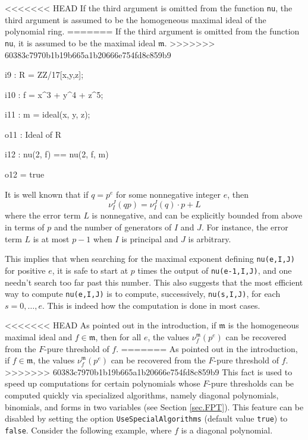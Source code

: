 \documentclass{amsart}
\newcommand{\idealm}{\mathfrak{m}}
\begin{document}

<<<<<<< HEAD
If the third argument is omitted from the function {\tt nu}, the third argument is assumed to be the homogeneous maximal ideal of the polynomial ring.
=======
If the third argument is omitted from the function {\tt nu}, it is assumed to be the maximal ideal $\idealm$. 
>>>>>>> 60383c7970b1b19b665a1b20666e754fd8c859b9

{\small
{}
\begin{MyVerbatim}

i9 : R = ZZ/17[x,y,z];

i10 : f = x^3 + y^4 + z^5;

i11 : m = ideal(x, y, z);

o11 : Ideal of R

i12 : nu(2, f) == nu(2, f, m)

o12 = true
\end{MyVerbatim}
}
\medspace


It is well known that if $q=p^e$ for some nonnegative integer $e$, then \[ \nu_I^J(qp) = \nu_I^J(q)\cdot p + L\]  where the error term $L$ is nonnegative, and can be explicitly bounded from above in terms of $p$ and the number of generators of $I$ and $J$.  For instance, the error term $L$ is at most $p-1$ when $I$ is principal and $J$ is arbitrary.

This implies that when searching for the maximal exponent defining {\tt nu(e,I,J)} for positive $e$, it is safe to start at $p$ times the output of {\tt nu(e-1,I,J)}, and one needn't search too far past this number.  This also suggests that the most efficient way to compute {\tt nu(e,I,J)} is to compute, successively, {\tt nu(s,I,J)}, for each $s = 0,\ldots,e$.  This is indeed how the computation is done in most cases.

<<<<<<< HEAD
As pointed out in the introduction, if $\mathfrak{m}$ is the homogeneous maximal ideal and $f \in \mathfrak{m}$, then for all $e$, the values $\nu^{\mathfrak{m}}_f(p^e)$ can be recovered from the $F$-pure threshold of $f$.
=======
As pointed out in the introduction, if $f \in \mathfrak{m}$, the values $\nu^{\mathfrak{m}}_f(p^e)$ can be recovered from the $F$-pure threshold of $f$.  
>>>>>>> 60383c7970b1b19b665a1b20666e754fd8c859b9
This fact is used to speed up computations for certain polynomials whose $F$-pure thresholds can be computed quickly via specialized algorithms, namely diagonal polynomials, binomials, and forms in two variables (see Section \ref{sec.FPT}).  This feature can be disabled by setting the option {\tt UseSpecialAlgorithms} (default value {\tt true}) to {\tt false}.  Consider the following example, where $f$ is a diagonal polynomial.
\end{document}
